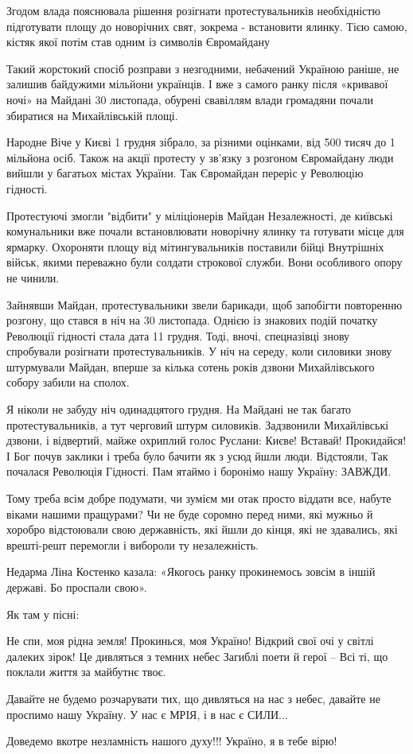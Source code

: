 Згодом влада пояснювала рішення розігнати протестувальників необхідністю
підготувати площу до новорічних свят, зокрема - встановити ялинку. Тією
самою, кістяк якої потім став одним із символів Євромайдану 

Такий жорстокий спосіб розправи з незгодними, небачений Україною раніше, не
залишив байдужими мільйони українців. І вже з самого ранку після «кривавої
ночі» на Майдані 30 листопада, обурені свавіллям влади громадяни почали
збиратися на Михайлівській площі. 

Народне Віче у Києві 1 грудня зібрало, за
різними оцінками, від 500 тисяч до 1 мільйона осіб. Також на акції протесту у
зв'язку з розгоном Євромайдану люди вийшли у багатьох містах України. Так
Євромайдан переріс у Революцію гідності. 

Протестуючі змогли "відбити" у міліціонерів Майдан Незалежності, де київські
комунальники вже почали встановлювати новорічну ялинку та готувати місце для
ярмарку. Охороняти площу від мітингувальників поставили бійці Внутрішніх
військ, якими переважно були солдати строкової служби. Вони особливого опору не
чинили. 

Зайнявши Майдан, протестувальники звели барикади, щоб запобігти повторенню
розгону, що стався в ніч на 30 листопада. Однією із знакових подій початку
Революції гідності стала дата 11 грудня. Тоді, вночі, спецназівці знову
спробували розігнати протестувальників. У ніч на середу, коли силовики знову
штурмували Майдан, вперше за кілька сотень років дзвони Михайлівського собору
забили на сполох.

Я ніколи не забуду ніч одинадцятого грудня. На Майдані не так багато
протестувальників, а тут черговий штурм силовиків. Задзвонили Михайлівські
дзвони, і  відвертий, майже охриплий голос Руслани: Києве! Вставай!
Прокидайся!  І Бог почув заклики і треба було бачити як з усюд йшли люди.
Відстояли, Так почалася Революція Гідності. Пам ятаймо і боронімо нашу Україну:
ЗАВЖДИ.

Тому треба всім добре подумати, чи зумієм ми отак просто віддати все, набуте
віками нашими пращурами? Чи не буде соромно перед ними, які мужньо й хоробро
відстоювали свою державність, які йшли до кінця, які не здавались, які
врешті-решт перемогли і вибороли ту незалежність. 

Недарма Ліна Костенко казала: «Якогось ранку прокинемось зовсім в іншій
державі. Бо проспали свою».

Як там у пісні: 

\obeycr
Не спи, моя рідна земля!
Прокинься, моя Україно!
Відкрий свої очі у світлі далеких зірок!
Це дивляться з темних небес
Загиблі поети й герої –
Всі ті, що поклали життя за майбутнє твоє.
\restorecr

Давайте не будемо розчарувати тих, що дивляться на нас з небес, давайте не
проспимо нашу Україну. У нас є МРІЯ, і в нас є СИЛИ...  

Доведемо вкотре незламність нашого духу!!! Україно, я в тебе вірю!
